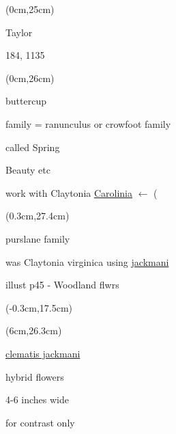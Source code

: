 \documentclass[a4paper,9pt]{article}
\begin{document}
\begin{textblock*}{4in}(0cm,25cm)%
	\tiny
	\begin{minipage}{4in} 
		\color{blue}
		Taylor\par
		184, 1135\par
	\end{minipage}%
\end{textblock*}%

\begin{textblock*}{4in}(0cm,26cm)%
	\tiny
	\begin{minipage}{4in} 
		\color{blue}
		buttercup\par
		family \color{red}= ranunculus or crowfoot family\par
		\color{red}
		called Spring\par
		Beauty etc\par
		work with Claytonia \underline{Carolinia} 
		\color{blue}$\leftarrow$ 
		\color{red}(
		\color{blue}
		{}\par
	\end{minipage}%
\end{textblock*}%

\begin{textblock*}{8cm}(0.3cm,27.4cm)%
	\tiny
	\begin{minipage}{8cm} 
		\tiny
		\hspace{1.5cm}\color{blue}purslane family\par
		\color{red}
		was Claytonia virginica using \ul{jackmani}\par
		illust p45 - Woodland flwrs\par		
	\end{minipage}%
\end{textblock*}%


\begin{textblock*}{4in}(-0.3cm,17.5cm)%
	\tiny
\end{textblock*}%

\begin{textblock*}{4in}(6cm,26.3cm)%
	\scriptsize
	\begin{minipage}{4in} 
		\ul{clematis jackmani}\par
		hybrid flowers\par
		4-6 inches wide\par
		for contrast only\par
	\end{minipage}%
\end{textblock*}%
\end{document}
